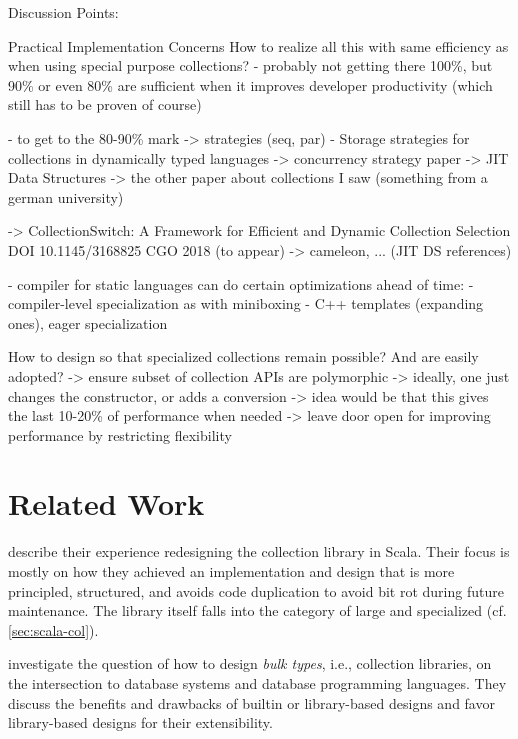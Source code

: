 \documentclass[sigconf, 10pt]{acmart}
\begin{document}
\begin{note}
Discussion Points:
 
Practical Implementation Concerns
 How to realize all this with same efficiency as when using special purpose
 collections?
 - probably not getting there 100\%, but 90\% or even 80\% are sufficient
   when it improves developer productivity (which still has to be proven of course)
  
 - to get to the 80-90\% mark
  -> strategies (seq, par)
   - Storage strategies for collections in dynamically typed languages \citep{Bolz:2013:SSC}
   -> concurrency strategy paper
  -> JIT Data Structures
     -> the other paper about collections I saw (something from a german university)

  -> CollectionSwitch: A Framework for Efficient and Dynamic Collection Selection
DOI 10.1145/3168825
CGO 2018 (to appear)
  -> cameleon, ... (JIT DS references)

- compiler for static languages can do certain optimizations ahead of time:
  - compiler-level specialization as with miniboxing \citep{Ureche:2013:MIS}
  - C++ templates (expanding ones), eager specialization

How to design so that specialized collections remain possible?
And are easily adopted?
 -> ensure subset of collection APIs are polymorphic
   -> ideally, one just changes the constructor, or adds a conversion
   -> idea would be that this gives the last 10-20\% of performance when needed
   -> leave door open for improving performance by restricting flexibility
\end{note}


\section{Related Work}

\citet{Odersky:2009} describe their experience
redesigning the collection library in Scala.
Their focus is mostly on how they achieved an implementation and design
that is more principled, structured, and avoids code duplication
to avoid bit rot during future maintenance.
The library itself falls into the category of large and specialized (cf. \cref{sec:scala-col}). 

\citet{Matthes:2000:BT} investigate the question of how to design \emph{bulk types}, i.e., collection libraries, on the intersection to database systems and database programming languages.
They discuss the benefits and drawbacks of builtin or library-based designs and favor library-based designs for their extensibility.
\end{document}
